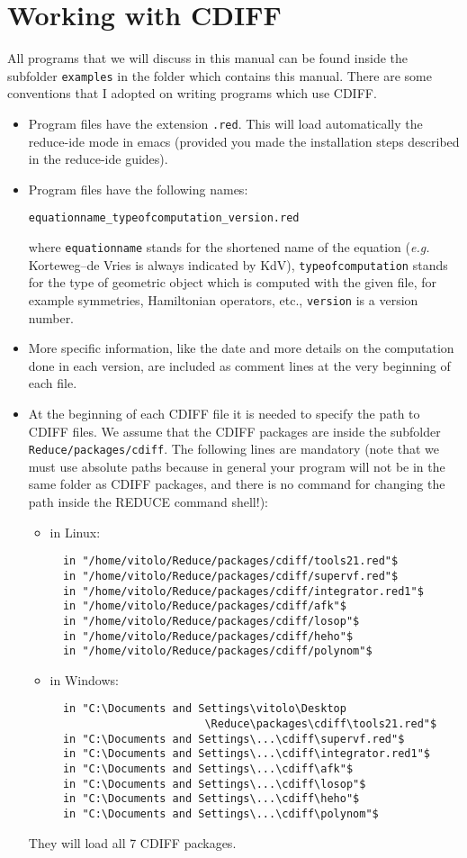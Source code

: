 \documentclass[12pt]{amsart}
\theoremstyle{definition}
\newcommand{\cdiff}{CDIFF\xspace}
\newcommand{\reduce}{REDUCE\xspace}
\begin{document}
\section{Working with \cdiff}

All programs that we will discuss in this manual can be found inside the
subfolder \texttt{examples} in the folder which contains this manual.  There
are some conventions that I adopted on writing programs which use \cdiff.
\begin{itemize}
\item Program files have the extension \texttt{.red}. This will load
  automatically the reduce-ide mode in emacs (provided you made the
  installation steps described in the reduce-ide guides).
\item Program files have the following names:
  \begin{center}
    \texttt{equationname\_typeofcomputation\_version.red}
  \end{center}
  where \texttt{equationname} stands for the shortened name of the equation
  (\emph{e.g.} Korteweg--de Vries is always indicated by KdV),
  \texttt{typeofcomputation} stands for the type of geometric object which is
  computed with the given file, for example symmetries, Hamiltonian operators,
  etc., \texttt{version} is a version number.
\item More specific information, like the date and more details on the
  computation done in each version, are included as comment lines at the very
  beginning of each file.
\item At the beginning of each \cdiff file it is needed to specify the path to
  \cdiff files. We assume that the \cdiff packages are inside the subfolder
  \texttt{Reduce/packages/cdiff}.  The following lines are mandatory (note that
  we must use absolute paths because in general your program will not be in the
  same folder as \cdiff packages, and there is no command for changing the path
  inside the \reduce command shell!):
  \begin{itemize}
  \item in Linux:
\begin{verbatim}
  in "/home/vitolo/Reduce/packages/cdiff/tools21.red"$
  in "/home/vitolo/Reduce/packages/cdiff/supervf.red"$
  in "/home/vitolo/Reduce/packages/cdiff/integrator.red1"$
  in "/home/vitolo/Reduce/packages/cdiff/afk"$
  in "/home/vitolo/Reduce/packages/cdiff/losop"$
  in "/home/vitolo/Reduce/packages/cdiff/heho"$
  in "/home/vitolo/Reduce/packages/cdiff/polynom"$
\end{verbatim}
   \item in Windows:
\begin{verbatim}
  in "C:\Documents and Settings\vitolo\Desktop
                        \Reduce\packages\cdiff\tools21.red"$
  in "C:\Documents and Settings\...\cdiff\supervf.red"$
  in "C:\Documents and Settings\...\cdiff\integrator.red1"$
  in "C:\Documents and Settings\...\cdiff\afk"$
  in "C:\Documents and Settings\...\cdiff\losop"$
  in "C:\Documents and Settings\...\cdiff\heho"$
  in "C:\Documents and Settings\...\cdiff\polynom"$
\end{verbatim}
   \end{itemize}
   They will load all 7 \cdiff packages.
\end{itemize}
\end{document}
